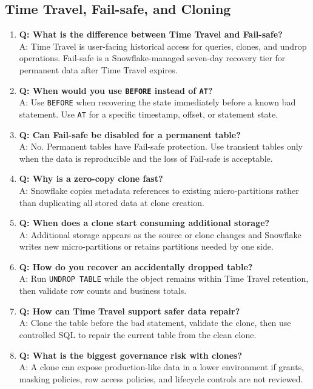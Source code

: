 \subsection{Time Travel, Fail-safe, and Cloning}
\begin{enumerate}
    \item \textbf{Q: What is the difference between Time Travel and Fail-safe?}\\
    A: Time Travel is user-facing historical access for queries, clones, and undrop operations. Fail-safe is a Snowflake-managed seven-day recovery tier for permanent data after Time Travel expires.
    \item \textbf{Q: When would you use \texttt{BEFORE} instead of \texttt{AT}?}\\
    A: Use \texttt{BEFORE} when recovering the state immediately before a known bad statement. Use \texttt{AT} for a specific timestamp, offset, or statement state.
    \item \textbf{Q: Can Fail-safe be disabled for a permanent table?}\\
    A: No. Permanent tables have Fail-safe protection. Use transient tables only when the data is reproducible and the loss of Fail-safe is acceptable.
    \item \textbf{Q: Why is a zero-copy clone fast?}\\
    A: Snowflake copies metadata references to existing micro-partitions rather than duplicating all stored data at clone creation.
    \item \textbf{Q: When does a clone start consuming additional storage?}\\
    A: Additional storage appears as the source or clone changes and Snowflake writes new micro-partitions or retains partitions needed by one side.
    \item \textbf{Q: How do you recover an accidentally dropped table?}\\
    A: Run \texttt{UNDROP TABLE} while the object remains within Time Travel retention, then validate row counts and business totals.
    \item \textbf{Q: How can Time Travel support safer data repair?}\\
    A: Clone the table before the bad statement, validate the clone, then use controlled SQL to repair the current table from the clean clone.
    \item \textbf{Q: What is the biggest governance risk with clones?}\\
    A: A clone can expose production-like data in a lower environment if grants, masking policies, row access policies, and lifecycle controls are not reviewed.
\end{enumerate}
